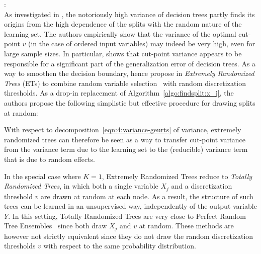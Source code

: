\begin{description}
\item \citet{geurts:2006}: \hfill \\
    As investigated in \citep{wehenkel:1997,geurts:2000},  the notoriously high
    variance of decision trees partly finds its origins from the high
    dependence of the splits with the random nature of the learning set. The
    authors empirically show that the variance of the optimal cut-point $v$ (in
    the case of ordered input variables) may indeed be very high, even for
    large sample sizes.  In particular, \citet{geurts:2002} shows that cut-point
    variance appears to be responsible for a significant part of the
    generalization error of decision trees. As a way to smoothen the decision
    boundary, \citet{geurts:2006} hence propose in \textit{Extremely Randomized
    Trees} (ETs) to combine random variable selection~\citep{amit:1997} with
    random discretization thresholds. As a drop-in replacement of Algorithm~\ref{algo:findsplit:x_j},
    the authors propose the following simplistic but effective
    procedure for drawing splits at random:
    \begin{algorithm}\label{algo:findsplit:et}
    Draw a random split on $X_j$ that partitions ${\cal L}_t$.
    \textnormal{
    \begin{algorithmic}[1]
    \Function{FindRandomSplit-ETs}{${\cal L}_t$, $X_j$}
        \State $\min_j = \min(\{ x_{i,j} | (\mathbf{x}_i,y_i) \in {\cal L}_t \})$
        \State $\max_j = \max(\{ x_{i,j} | (\mathbf{x}_i,y_i) \in {\cal L}_t \})$
        \State Draw $v$ uniformly at random from $[\min_j, \max_j[$
        \State \Return $s^v_j$
    \EndFunction
    \end{algorithmic}
    }
    \end{algorithm}
    With respect to decomposition~\ref{eqn:4:variance-geurts} of variance,
    extremely randomized trees can therefore be seen as a way to transfer
    cut-point variance from the variance term due to the learning
    set to the (reducible) variance term that is due to random effects.

    In the special case where $K=1$, Extremely Randomized Trees reduce to
    \textit{Totally Randomized Trees}, in which both a single variable $X_j$
    and a discretization threshold $v$ are drawn at random at each node. As a
    result, the structure of such trees can be learned in an unsupervised way,
    independently of the output variable $Y$. In this setting, Totally
    Randomized Trees are very close to Perfect Random Tree
    Ensembles~\citep{cutler:2001} since both draw $X_j$ and $v$ at random.
    These methods are however not strictly equivalent since they do not draw
    the random discretization thresholds $v$ with respect to the same
    probability distribution.


\end{description}
